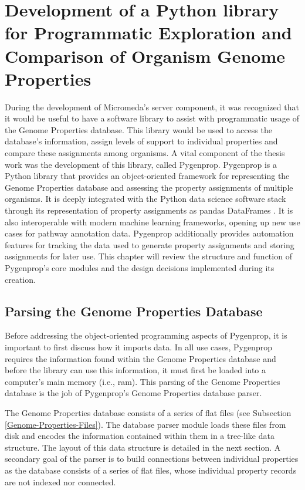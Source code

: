 \chapter{Development of a Python library for Programmatic Exploration and Comparison of Organism Genome Properties} \label{Pygenprop}

During the development of Micromeda's server component, it was recognized that it would be useful to have a software library to assist with programmatic usage of the Genome Properties database. This library would be used to access the database's information, assign levels of support to individual properties and compare these assignments among organisms. A vital component of the thesis work was the development of this library, called Pygenprop. Pygenprop is a Python library that provides an object-oriented framework \cite{booch1986object} for representing the Genome Properties database and assessing the property assignments of multiple organisms. It is deeply integrated with the Python data science software stack \cite{scipystack} through its representation of property assignments as pandas DataFrames \cite{mckinney2010data}. It is also interoperable with modern machine learning frameworks, opening up new use cases for pathway annotation data. Pygenprop additionally provides automation features for tracking the data used to generate property assignments and storing assignments for later use. This chapter will review the structure and function of Pygenprop's core modules and the design decisions implemented during its creation.

\section{Parsing the Genome Properties Database} \label{genome-properties-parser}

Before addressing the object-oriented programming aspects of Pygenprop, it is important to first discuss how it imports data. In all use cases, Pygenprop requires the information found within the Genome Properties database and before the library can use this information, it must first be loaded into a computer's main memory (i.e., \gls{ram}). This parsing of the Genome Properties database is the job of Pygenprop's Genome Properties database parser.

The Genome Properties database consists of a series of flat files (see Subsection \ref{Genome-Properties-Files}). The database parser module loads these files from disk and encodes the information contained within them in a tree-like data structure. The layout of this data structure is detailed in the next section. A secondary goal of the parser is to build connections between individual properties as the database consists of a series of flat files, whose individual property records are not indexed nor connected. 


